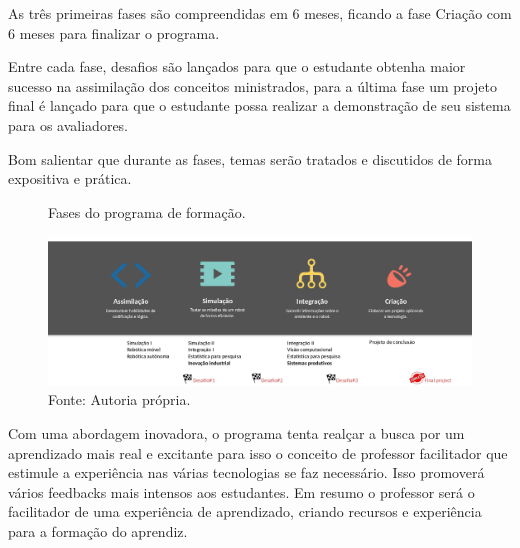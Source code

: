 As três primeiras fases são compreendidas em 6 meses, ficando a fase Criação com 6 meses para finalizar o programa. 

Entre cada fase, desafios são lançados para que o estudante obtenha maior sucesso na assimilação dos conceitos ministrados, para a última fase um projeto final é lançado para que o estudante possa realizar a demonstração de seu sistema para os avaliadores.

Bom salientar que durante as fases, temas serão tratados e discutidos de forma expositiva e prática.

\begin{figure}[H]
  \centering
  \caption{Fases do programa de formação.}
  \includegraphics[width=1\textwidth]{Figures/metodologia.png}
  \caption*{Fonte: Autoria própria.}
  \label{fig:metodologia}
\end{figure}

Com uma abordagem inovadora, o programa tenta realçar a busca por um aprendizado mais real e excitante para isso o conceito de professor facilitador que estimule a experiência nas várias tecnologias se faz necessário. Isso promoverá vários feedbacks mais intensos aos estudantes. Em resumo o professor será o facilitador de uma experiência de aprendizado, criando recursos e experiência para a formação do aprendiz.
